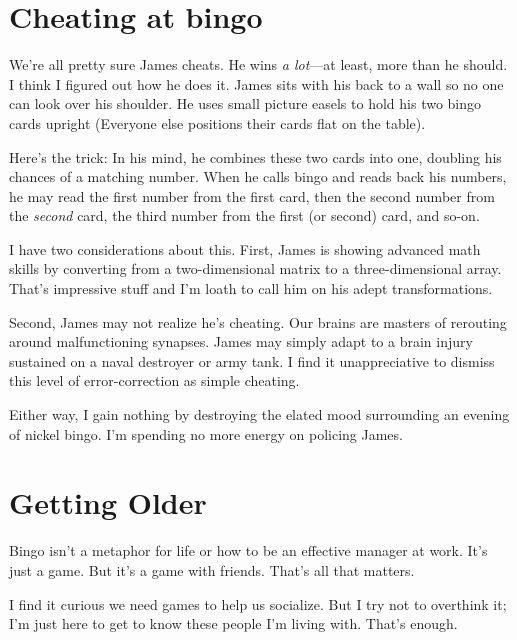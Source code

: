\documentclass[
  letterpaper,
  DIV=11,
  numbers=noendperiod]{scrreprt}
\begin{document}
\section*{Cheating at bingo}\label{cheating-at-bingo}


We're all pretty sure James cheats. He wins \emph{a lot}---at least,
more than he should. I think I figured out how he does it. James sits
with his back to a wall so no one can look over his shoulder. He uses
small picture easels to hold his two bingo cards upright (Everyone else
positions their cards flat on the table).

Here's the trick: In his mind, he combines these two cards into one,
doubling his chances of a matching number. When he calls bingo and reads
back his numbers, he may read the first number from the first card, then
the second number from the \emph{second} card, the third number from the
first (or second) card, and so-on.

I have two considerations about this. First, James is showing advanced
math skills by converting from a two-dimensional matrix to a
three-dimensional array. That's impressive stuff and I'm loath to call
him on his adept transformations.

Second, James may not realize he's cheating. Our brains are masters of
rerouting around malfunctioning synapses. James may simply adapt to a
brain injury sustained on a naval destroyer or army tank. I find it
unappreciative to dismiss this level of error-correction as simple
cheating.

Either way, I gain nothing by destroying the elated mood surrounding an
evening of nickel bingo. I'm spending no more energy on policing James.

\section*{Getting Older}\label{getting-older}


Bingo isn't a metaphor for life or how to be an effective manager at
work. It's just a game. But it's a game with friends. That's all that
matters.

I find it curious we need games to help us socialize. But I try not to
overthink it; I'm just here to get to know these people I'm living with.
That's enough.
\end{document}
